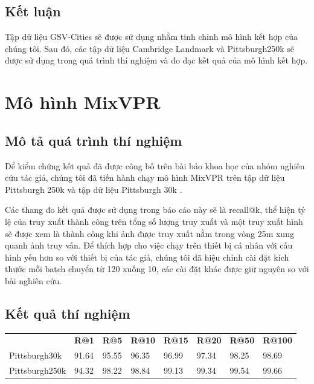 \subsection{Kết luận}
Tập dữ liệu GSV-Cities \cite{Ali_bey_2022} sẽ được sử dụng nhằm tinh chỉnh mô hình kết hợp của chúng tôi. Sau đó, các tập dữ liệu Cambridge Landmark \cite{kendall2016posenet} và Pittsburgh250k \cite{6618963} sẽ được sử dụng trong quá trình thí nghiệm và đo đạc kết quả của mô hình kết hợp.

\section{Mô hình MixVPR}
\subsection*{Mô tả quá trình thí nghiệm}

Để kiểm chứng kết quả đã được công bố trên bài báo khoa học của nhóm nghiên cứu tác giả, chúng tôi đã tiến hành chạy mô hình MixVPR \cite{alibey2023mixvpr} trên tập dữ liệu Pittsburgh 250k \cite{6618963} và tập dữ liệu Pittsburgh 30k \cite{6618963}.

Các thang đo kết quả được sử dụng trong báo cáo này sẽ là recall@k, thể hiện tỷ lệ của truy xuất thành công trên tổng số lượng truy xuất và một truy xuất hình sẽ được xem là thành công khi ảnh được truy xuất nằm trong vòng 25m xung quanh ảnh truy vấn. Để thích hợp cho việc chạy trên thiết bị cá nhân với cấu hình yếu hơn so với thiết bị của tác giả, chúng tôi đã hiệu chỉnh cài đặt kích thước mỗi batch chuyển từ 120 xuống 10, các cài đặt khác được giữ nguyên so với bài nghiên cứu.

\subsection*{Kết quả thí nghiệm}

\begin{table}[H]
	\begin{tabular}{llllllll}
		               & \textbf{R@1} & \textbf{R@5} & \textbf{R@10} & \textbf{R@15} & \textbf{R@20} & \textbf{R@50} & \textbf{R@100} \\
		Pittsburgh30k  & 91.64        & 95.55        & 96.35         & 96.99         & 97.34         & 98.25         & 98.69          \\
		Pittsburgh250k & 94.32        & 98.22        & 98.84         & 99.13         & 99.34         & 99.54         & 99.66
	\end{tabular}
\end{table}

